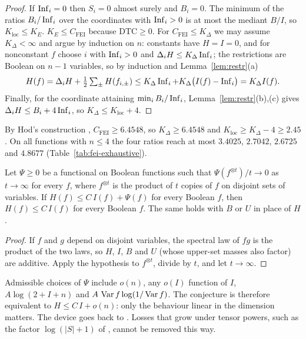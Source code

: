 \begin{proof}
If $\operatorname{Inf}_i=0$ then $S_i=0$ almost surely and $B_i=0$. The minimum of the ratios $B_i/\operatorname{Inf}_i$ over the coordinates with $\operatorname{Inf}_i>0$ is at most the mediant $B/I$, so $K_{\mathrm{loc}}\le K_E$. $K_E\le C_{\mathrm{FEI}}$ because $\mathrm{DTC}\ge0$. For $C_{\mathrm{FEI}}\le K_\Delta$ we may assume $K_\Delta<\infty$ and argue by induction on $n$: constants have $H=I=0$, and for nonconstant $f$ choose $i$ with $\operatorname{Inf}_i>0$ and $\Delta_iH\le K_\Delta\operatorname{Inf}_i$; the restrictions are Boolean on $n-1$ variables, so by induction and Lemma~\ref{lem:restr}(a)
\[
H(f)=\Delta_iH+\tfrac12\textstyle\sum_\pm H(f_{i,\pm})\le K_\Delta\operatorname{Inf}_i+K_\Delta\bigl(I(f)-\operatorname{Inf}_i\bigr)=K_\Delta I(f).
\]
Finally, for the coordinate attaining $\min_iB_i/\operatorname{Inf}_i$, Lemma~\ref{lem:restr}(b),(c) gives $\Delta_iH\le B_i+4\operatorname{Inf}_i$, so $K_\Delta\le K_{\mathrm{loc}}+4$.
\end{proof}

By Hod's construction \cite{Hod2017}, $C_{\mathrm{FEI}}\ge6.4548$, so $K_\Delta\ge6.4548$ and $K_{\mathrm{loc}}\ge K_\Delta-4\ge2.45$. On all functions with $n\le4$ the four ratios reach at most $3.4025$, $2.7042$, $2.6725$ and $4.8677$ (Table~\ref{tab:fei-exhaustive}).

\begin{proposition}\label{prop:tensor}
Let $\Psi\ge0$ be a functional on Boolean functions such that $\Psi(f^{\otimes t})/t\to0$ as $t\to\infty$ for every $f$, where $f^{\otimes t}$ is the product of $t$ copies of $f$ on disjoint sets of variables. If $H(f)\le C\,I(f)+\Psi(f)$ for every Boolean $f$, then $H(f)\le C\,I(f)$ for every Boolean $f$. The same holds with $B$ or $U$ in place of $H$.
\end{proposition}

\begin{proof}
If $f$ and $g$ depend on disjoint variables, the spectral law of $fg$ is the product of the two laws, so $H$, $I$, $B$ and $U$ (whose upper-set masses also factor) are additive. Apply the hypothesis to $f^{\otimes t}$, divide by $t$, and let $t\to\infty$.
\end{proof}

Admissible choices of $\Psi$ include $o(n)$, any $o(I)$ function of $I$, $A\log(2+I+n)$ and $A\,\operatorname{Var} f\log(1/\operatorname{Var} f)$. The conjecture is therefore equivalent to $H\le C\,I+o(n)$: only the behaviour linear in the dimension matters. The device goes back to \cite{OWZ2011}. Losses that grow under tensor powers, such as the factor $\log(|S|+1)$ of \cite{KKLMS2020}, cannot be removed this way.

